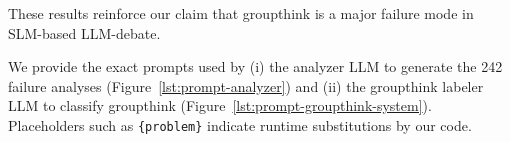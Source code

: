 These results reinforce our claim that groupthink is a major failure mode in SLM-based LLM-debate.

We provide the exact prompts used by (i) the analyzer LLM to generate the 242 failure analyses (Figure~\ref{lst:prompt-analyzer}) and (ii) the groupthink labeler LLM to classify groupthink (Figure~\ref{lst:prompt-groupthink-system}). Placeholders such as \texttt{\{problem\}} indicate runtime substitutions by our code.









